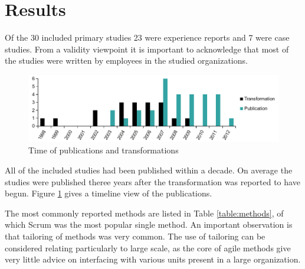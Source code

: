 \documentclass[lnbip]{svmultln}
\begin{document}
%
%


\section{Results}
\label{sec:results}

Of the 30 included primary studies 23 were experience reports and 7 were case
studies. From a validity viewpoint it is important to acknowledge that most of
the studies were written by employees in the studied organizations.

\begin{figure}[h]
  \begin{center}
    \includegraphics[width=1\textwidth]{publicationschart.pdf}
    \caption{Time of publications and transformations}
    \label{fig:publications}
  \end{center}
\end{figure}

All of the included studies had been published within a decade. On average the
studies were published theree years after the transformation was reported to
have begun. Figure \ref{fig:publications} gives a timeline view of the
publications.


The most commonly reported methods are listed in Table \ref{table:methods}, of
which Scrum was the most popular single method. An important observation is that
tailoring of methods was very common. The use of tailoring can be considered
relating particularly to large scale, as the core of agile methods give very
little advice on interfacing with various units present in a large organization.
\end{document}

